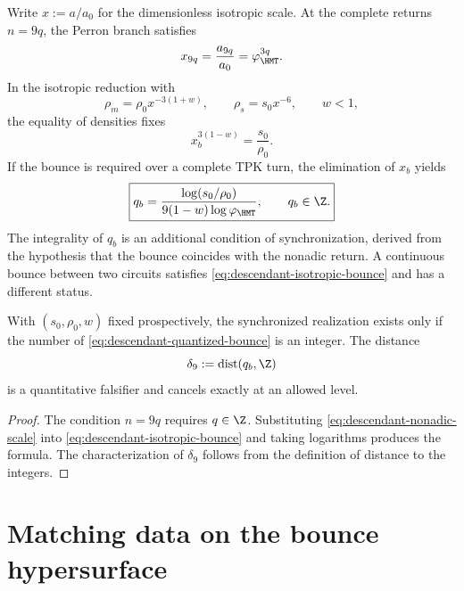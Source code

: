 Write \(x:=a/a_0\) for the dimensionless isotropic scale. At the
complete returns \(n=9q\), the Perron branch satisfies
\begin{equation}
 x_{9q}=\frac{a_{9q}}{a_0}=\varphi_{\HMT}^{3q}.
 \label{eq:descendant-nonadic-scale}
\end{equation}
In the isotropic reduction with
\begin{equation}
 \rho_m=\rho_0x^{-3(1+w)},
 \qquad
 \rho_s=s_0x^{-6},
 \qquad
 w<1,
 \label{eq:descendant-isotropic-densities}
\end{equation}
the equality of densities fixes
\begin{equation}
 x_b^{3(1-w)}=\frac{s_0}{\rho_0}.
 \label{eq:descendant-isotropic-bounce}
\end{equation}
If the bounce is required over a complete TPK turn, the elimination of
\(x_b\) yields
\begin{equation}
 \boxed{
 q_b=
 \frac{\log(s_0/\rho_0)}
 {9(1-w)\log\varphi_{\HMT}},
 \qquad
 q_b\in\Z.}
 \label{eq:descendant-quantized-bounce}
\end{equation}
The integrality of \(q_b\) is an additional condition of synchronization,
derived from the hypothesis that the bounce coincides with the nonadic return.
A continuous bounce between two circuits satisfies
\cref{eq:descendant-isotropic-bounce} and has a different status.

\begin{proposition}
\label{prop:descendant-quantization-falsifier}
With \((s_0,\rho_0,w)\) fixed prospectively, the synchronized realization
exists only if the number of
\cref{eq:descendant-quantized-bounce} is an integer. The distance
\begin{equation}
 \delta_9:=\operatorname{dist}(q_b,\Z)
 \label{eq:descendant-quantization-defect}
\end{equation}
is a quantitative falsifier and cancels exactly at an allowed level.
\end{proposition}

\begin{proof}
The condition \(n=9q\) requires \(q\in\Z\). Substituting
\cref{eq:descendant-nonadic-scale} into
\cref{eq:descendant-isotropic-bounce} and taking logarithms produces the formula.
The characterization of \(\delta_9\) follows from the definition of distance to
the integers.
\end{proof}

\section{Matching data on the bounce hypersurface}

